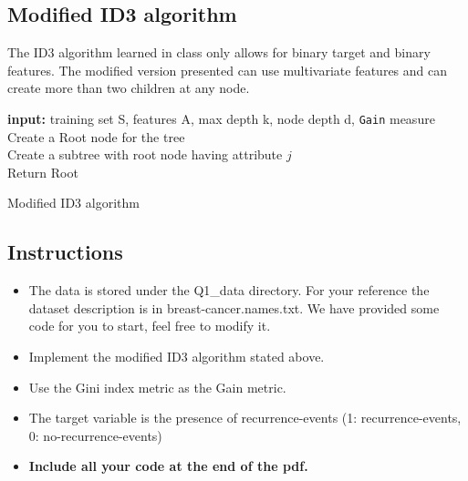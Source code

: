 \documentclass{article}
\begin{document}
\subsection{Modified ID3 algorithm}
The ID3 algorithm learned in class only allows for binary target and binary features. The modified version presented can use multivariate features and can create more than two children at any node. \\

\begin{algorithm}[H]
\SetAlgoLined
\textbf{input:} training set S, features A, max depth k, node depth d, \texttt{Gain} measure\\
Create a Root node for the tree \\
Create a subtree with root node having attribute $j$ \\
Return Root
 \caption{Modified ID3 algorithm}
\end{algorithm}

\subsection{Instructions}
\begin{itemize}
\item The data is stored under the Q1\_data directory. For your reference the dataset description is in breast-cancer.names.txt. We have provided some code for you to start, feel free to modify it.
\item Implement the modified ID3 algorithm stated above. 
\item Use the Gini index metric as the Gain metric.
\item The target variable is the presence of recurrence-events (1: recurrence-events, 0: no-recurrence-events)
\item \textbf{Include all your code at the end of the pdf.}
\end{itemize}
\end{document}

